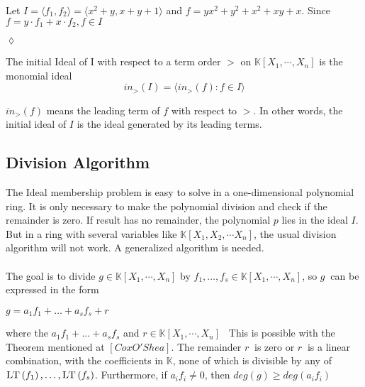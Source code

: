 \newpage

\begin{env_example}\normalfont
Let $ I= \langle f_{1},f_{2} \rangle = \langle x^{2}+y, x+y+1 \rangle $ and $f=yx^{2}+y^{2}+x^{2}+xy+x$. Since $f= y \cdot f_{1} + x \cdot f_{2}, f\in I$
\begin{flushright}
$\lozenge$
\end{flushright} 
\end{env_example}


\begin{env_definition}
\cite{tigers}The initial Ideal of I with respect to a term order $>$ on $\mathbb{K}\left[X_{1}, \cdots, X_{n}\right]$ is the monomial ideal \\
\[in_{>}(I) = \langle in_{>}(f) : f \in I  \rangle \] 

\end{env_definition}
$in_{>}(f)$ means the leading term of $f$ with respect to $>$. In other words, the initial ideal of $I$ is the ideal generated by its leading terms.



\subsection{Division Algorithm}
\label{subsec:division}

The Ideal membership problem is easy to solve in a one-dimensional polynomial ring. It is only necessary to make the polynomial division and check if the remainder is zero. 
If result has no remainder, the polynomial $p$ lies in the ideal $I$.
But in a ring with several variables like $ \mathbb{K} \left[X_{1},X_{2},\cdots X_{n}\right]$, the usual division algorithm will not work. A generalized algorithm is needed.\\ \\
The goal is to divide $g \in \mathbb{K}\left[X_{1}, \cdots, X_{n}\right] $ by 
$f_{1}, \ldots, f_{s} \in \mathbb{K}\left[X_{1}, \cdots, X_{n}\right]$, so $g~$ can be expressed in the form \begin{center}
$g = a_{1}f_{1}+ \ldots + a_{s}f_{s} +r$
\end{center} 
where the $a_{1}f_{1}+ \ldots + a_{s}f_{s} $ and $r \in \mathbb{K}\left[X_{1}, \cdots, X_{n}\right]$ \
This is possible with the Theorem mentioned at  $\left[ Cox O'Shea\right] $.
The remainder $r~$ is zero or $r~$ is a linear combination, with the coefficients in $\mathbb{K}$, none of which is divisible by any of
$\textsc{LT}\left(f_{1} \right), \ldots, \textsc{LT}\left(f_{s} \right)  $.
Furthermore, if $a_{i}f_{i} \neq 0 $, then
$deg(g) \geq deg(a_{i}f_{i})$

